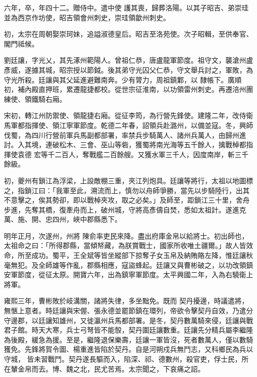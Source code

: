\begin{pinyinscope}
 六年，卒，年四十二。贈侍中。遣中使
 護其喪，歸葬洛陽。以其子昭吉、弟崇珪並為西京作坊使，昭吉領會州刺史，崇珪領歙州刺史。



 初，太宗在周朝娶崇珂妹，追謚淑德皇后。昭吉至洛苑使。次子昭輯，至供奉官、閣門祗候。



 劉廷讓，字光乂，其先涿州範陽人。曾祖仁恭，唐盧龍軍節度。祖守文，襲滄州盧彥威，遂據其城，昭宗授以節鉞。後其弟守光囚父仁恭，守文舉兵討之，軍敗，為守光所殺。廷讓與其父延進避難南奔。少有膂力，周祖鎮鄴，以
 隸帳下。廣順初，補內殿直押班，累遷龍捷都校。從世宗征淮南，以功領雷州刺史。再遷涪州團練使、領鐵騎右廂。



 宋初，轉江州防禦使、領龍捷右廂。從征李筠，為行營先鋒使。建隆二年，改侍衛馬軍都指揮使、領江寧軍節度。乾德二年春，詔領兵赴潞州，以備並寇。冬，興師伐蜀，為四川行營前軍兵馬副都部署，率禁兵步騎萬人、諸州兵萬人，由歸州進討。入其境，連破松木、三會、巫山等砦，獲蜀將南光海等五千餘人，擒戰棹都指揮使袁德
 宏等千二百人，奪戰艦二百餘艘。又獲水軍三千人，因度南岸，斬三千餘級。



 初，夔州有鎖江為浮梁，上設敵棚三重，夾江列炮具。廷讓等將行，太祖以地圖標之，指鎖江曰：「我軍至此，溯流而上，慎勿以舟師爭勝，當先以步騎陸行，出其不意擊之，俟其勢卻，即以戰棹夾攻，取之必矣。」及師至，距鎖江三十里，舍舟步進，先奪其橋，復牽舟而上，破州城，守將高彥儔自焚，悉如太祖計。遂進克萬、施、開、忠四州，峽中郡縣悉下。



 明年正月，次遂州，州將
 陳俞率吏民來降。盡出府庫金帛以給將士。初出師也，太祖命之曰：「所得郡縣，當傾帑藏，為朕賞戰士，國家所收唯土疆爾。」故人皆效命，所至成功。蜀平，王全斌等皆坐縱部下掠奪子女玉帛及納賄賂左降，惟廷讓秋毫無犯。及全師雄等作亂，郡縣相應，寇盜蜂起。廷讓又與曹彬破之，以功改領鎮安軍節度，從征太原。開寶六年，出為鎮寧軍節度。太平興國二年，入為右驍衛上將軍。



 雍熙三年，曹彬敗於岐溝關，諸將失律，多坐黜免。既而
 契丹擾邊，時議遣將，無愜上意者。時廷讓與宋偓、張永德並罷節鎮在環列，帝欲令擊契丹自效，乃遣分守邊郡，以廷讓知雄州，又徙瀛州兵馬都部署。是冬，契丹數萬騎來侵，廷讓與戰君子館。時天大寒，兵士弓弩皆不能彀，契丹圍廷讓數重。廷讓先分精兵屬李繼隆為後殿，緩急為援。至是，繼隆退保樂壽，廷讓一軍皆沒，死者數萬人，僅以數騎獲免。先鋒將賀令圖、楊重進皆陷於契丹。自是河朔戍兵無鬥志，又科鄉民為兵以守城，
 皆未習戰鬥。契丹遂長驅而入，陷深、祁、德數州，殺官吏，俘士民，所在輦金帛而去。博、魏之北，民尤苦焉。太宗聞之，下哀痛之詔。




\end{pinyinscope}
